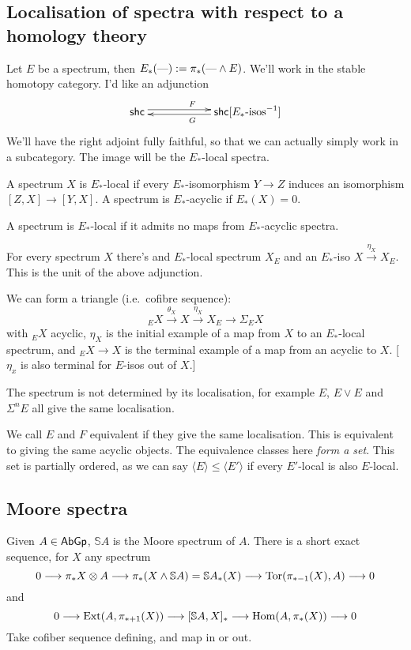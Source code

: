 \documentclass[11pt]{article}
\newcommand{\KanSemResponse}[1]
{
\thispagestyle{fancy}
\subsection*{#1}
}
\begin{document}
\begin{MarkusLocalisation}
\KanSemResponse
{Localisation of spectra with respect to a homology theory}
Let $E$ be a spectrum, then $E_*(\textup{---}):=\pi_*(\textup{---}\wedge E)$. We'll work in the stable homotopy category. I'd like an adjunction
\[\xymatrix@R=.3cm@C=2cm{
\mathsf{shc}  \ar@<.6ex>[r]^{F}&
\mathsf{shc}[\textup{$E_*$-isos}^{-1}] \ar@<.4ex>[l]^{G}\\
}\]
We'll have the right adjoint fully faithful, so that we can actually simply work in a subcategory. The image will be the $E_*$-local spectra.
\begin{defn*}
A spectrum $X$ is $E_*$-local if every $E_*$-isomorphism $Y\to Z$ induces an isomorphism $[Z,X]\to[Y,X]$. A spectrum is $E_*$-acyclic if $E_*(X)=0$.
\end{defn*}
\begin{lem*}
A spectrum is $E_*$-local if it admits no maps from $E_*$-acyclic spectra.
\end{lem*}
\begin{thm*}
For every spectrum $X$ there's and $E_*$-local spectrum $X_E$ and an $E_*$-iso $X\overset{\eta_X}{\to} X_E$. This is the unit of the above adjunction.
\end{thm*}
We can form a triangle (i.e.\ cofibre sequence):
\[{_E}X\overset{\theta_X}{\to}X\overset{\eta_X}{\to}X_E\to\Sigma{{_E}X}\]
with ${_E}X$ acyclic, $\eta_X$ is the initial example of a map from $X$ to an $E_*$-local spectrum, and $_EX\to X$ is the terminal example of a map from an acyclic to $X$. [$\eta_x$ is also terminal for $E$-isos out of $X$.]

The spectrum is not determined by its localisation, for example $E$, $E\vee E$ and $\Sigma^nE$ all give the same localisation.
\begin{defn*}
We call $E$ and $F$ equivalent if they give the same localisation. This is equivalent to giving the same acyclic objects. The equivalence classes here \emph{form a set}. This set is partially ordered, as we can say $\langle E\rangle\leq\langle E'\rangle$ if every $E'$-local is also $E$-local.
\end{defn*}
\subsection*{Moore spectra}

\begin{exmp*} Given $A\in\operatorname{{\mathsf{AbGp}}}$, $\mathbb{S}A$ is the Moore spectrum of $A$. There is a short exact sequence, for $X$ any spectrum
\[0\longrightarrow\pi_*X\otimes A\longrightarrow\pi_*(X\wedge\mathbb{S}A)=\mathbb{S}A_*(X)\longrightarrow\operatorname{Tor}(\pi_{*-1}(X),A)\longrightarrow0\]
and
\[0\longrightarrow\operatorname{Ext}(A,\pi_{*+1}(X))\longrightarrow[\mathbb{S}A,X]_*\longrightarrow\operatorname{Hom}(A,\pi_*(X))\longrightarrow0\]
Take cofiber sequence defining, and map in or out.


\end{exmp*}
\end{MarkusLocalisation}
\end{document}
